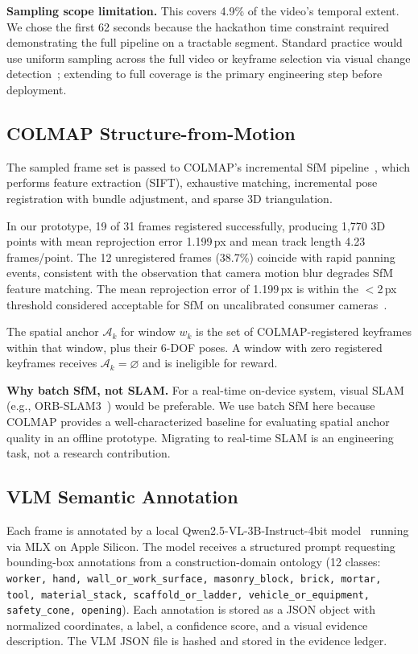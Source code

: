 \documentclass[sigconf,nonacm]{acmart}
\begin{document}
\textbf{Sampling scope limitation.}
This covers 4.9\% of the video's temporal extent.
We chose the first 62 seconds because the hackathon time constraint required demonstrating the full pipeline on a tractable segment.
Standard practice would use uniform sampling across the full video or keyframe selection via visual change detection~\cite{actionformer}; extending to full coverage is the primary engineering step before deployment.

\subsection{COLMAP Structure-from-Motion}

The sampled frame set is passed to COLMAP's incremental SfM pipeline~\cite{colmap}, which performs feature extraction (SIFT), exhaustive matching, incremental pose registration with bundle adjustment, and sparse 3D triangulation.

In our prototype, 19 of 31 frames registered successfully, producing 1,770 3D points with mean reprojection error 1.199\,px and mean track length 4.23 frames/point.
The 12 unregistered frames (38.7\%) coincide with rapid panning events, consistent with the observation that camera motion blur degrades SfM feature matching.
The mean reprojection error of 1.199\,px is within the $<$2\,px threshold considered acceptable for SfM on uncalibrated consumer cameras~\cite{colmap}.

The spatial anchor $\mathcal{A}_k$ for window $w_k$ is the set of COLMAP-registered keyframes within that window, plus their 6-DOF poses.
A window with zero registered keyframes receives $\mathcal{A}_k = \varnothing$ and is ineligible for reward.

\textbf{Why batch SfM, not SLAM.}
For a real-time on-device system, visual SLAM (e.g., ORB-SLAM3~\cite{orbslam3}) would be preferable.
We use batch SfM here because COLMAP provides a well-characterized baseline for evaluating spatial anchor quality in an offline prototype.
Migrating to real-time SLAM is an engineering task, not a research contribution.

\subsection{VLM Semantic Annotation}

Each frame is annotated by a local Qwen2.5-VL-3B-Instruct-4bit model~\cite{qwen2vl} running via MLX on Apple Silicon.
The model receives a structured prompt requesting bounding-box annotations from a construction-domain ontology (12 classes: \texttt{worker, hand, wall\_or\_work\_surface, masonry\_block, brick, mortar, tool, material\_stack, scaffold\_or\_ladder, vehicle\_or\_equipment, safety\_cone, opening}).
Each annotation is stored as a JSON object with normalized coordinates, a label, a confidence score, and a visual evidence description.
The VLM JSON file is hashed and stored in the evidence ledger.
\end{document}
